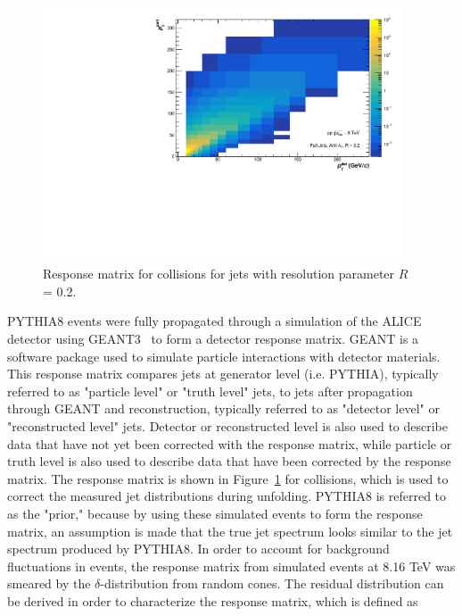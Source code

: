 \begin{figure}[hbt!]
    \centering
    \includegraphics[width=0.95\textwidth]{figures/Response/Response_R02.pdf}
    \caption{Response matrix for \pp collisions for jets with resolution parameter $R$ = 0.2.}
    \label{fig:ResponseMatrix}
\end{figure}

PYTHIA8 events were fully propagated through a simulation of the ALICE detector using GEANT3~\cite{Brun:1987ma} to form a detector response matrix. GEANT is a software package used to simulate particle interactions with detector materials. This response matrix compares jets at generator level (i.e. PYTHIA), typically referred to as "particle level" or "truth level" jets, to jets after propagation through GEANT and reconstruction, typically referred to as "detector level" or "reconstructed level" jets. Detector or reconstructed level is also used to describe data that have not yet been corrected with the response matrix, while particle or truth level is also used to describe data that have been corrected by the response matrix. The response matrix is shown in Figure~\ref{fig:ResponseMatrix} for \pp collisions, which is used to correct the measured jet distributions during unfolding. PYTHIA8 is referred to as the "prior," because by using these simulated events to form the response matrix, an assumption is made that the true jet spectrum looks similar to the jet spectrum produced by PYTHIA8. In order to account for background fluctuations in \pPb events, the response matrix from simulated \pp events at 8.16 TeV was smeared by the $\delta$-\pT distribution from random cones. The residual distribution can be derived in order to characterize the response matrix, which is defined as

